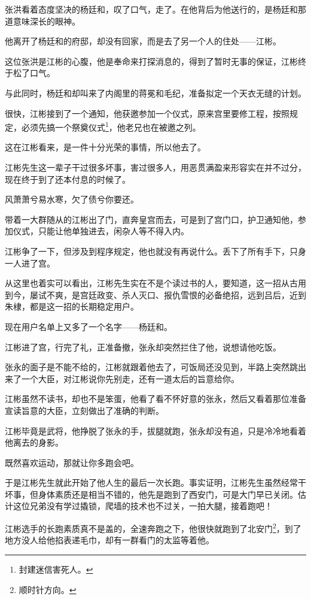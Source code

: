 \begin{multicols}{\theparacolNo}
张洪看着态度坚决的杨廷和，叹了口气，走了。在他背后为他送行的，是杨廷和那道意味深长的眼神。

他离开了杨廷和的府邸，却没有回家，而是去了另一个人的住处——江彬。

这位张洪是江彬的心腹，他是奉命来打探消息的，得到了暂时无事的保证，江彬终于松了口气。

与此同时，杨廷和却叫来了内阁里的蒋冕和毛纪，准备拟定一个天衣无缝的计划。

很快，江彬接到了一个通知，他获邀参加一个仪式，原来宫里要修工程，按照规定，必须先搞一个祭奠仪式\footnote{封建迷信害死人。}，他老兄也在被邀之列。

这在江彬看来，是一件十分光荣的事情，所以他去了。

江彬先生这一辈子干过很多坏事，害过很多人，用恶贯满盈来形容实在并不过分，现在终于到了还本付息的时候了。

风萧萧兮易水寒，欠了债兮你要还。

带着一大群随从的江彬出了门，直奔皇宫而去，可是到了宫门口，护卫通知他，参加仪式，只能让他单独进去，闲杂人等不得入内。

江彬争了一下，但涉及到程序规定，他也就没有再说什么。丢下了所有手下，只身一人进了宫。

从这里也着实可以看出，江彬先生实在不是个读过书的人，要知道，这一招从古用到今，屡试不爽，是宫廷政变、杀人灭口、报仇雪恨的必备绝招，远到吕后，近到朱棣，都是这一招的长期稳定用户。

现在用户名单上又多了一个名字——杨廷和。

江彬进了宫，行完了礼，正准备撤，张永却突然拦住了他，说想请他吃饭。

张永的面子是不能不给的，江彬就跟着他去了，可饭局还没见到，半路上突然跳出来了一个大臣，对江彬说你先别走，还有一道太后的旨意给你。

江彬虽然不读书，却也不是笨蛋，他看了看不怀好意的张永，然后又看着那位准备宣读旨意的大臣，立刻做出了准确的判断。

江彬毕竟是武将，他挣脱了张永的手，拔腿就跑，张永却没有追，只是冷冷地看着他离去的身影。

既然喜欢运动，那就让你多跑会吧。

于是江彬先生就此开始了他人生的最后一次长跑。事实证明，江彬先生虽然经常干坏事，但身体素质还是相当不错的，他先是跑到了西安门，可是大门早已关闭。估计这位兄弟没有学过撬锁，爬墙的技术也不过关，一拍大腿，接着跑吧！

江彬选手的长跑素质真不是盖的，全速奔跑之下，他很快就跑到了北安门\footnote{顺时针方向。}，到了地方没人给他掐表递毛巾，却有一群看门的太监等着他。


\end{multicols}

